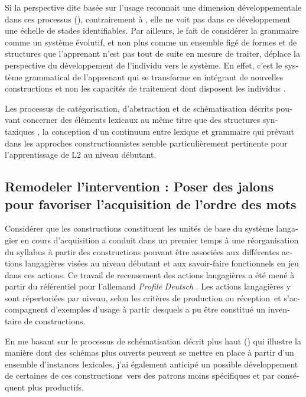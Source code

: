 \documentclass[output=paper]{langscibook}
\begin{document}
\begin{otherlanguage}{french}
Si la perspective dite basée sur l’usage reconnait une dimension développementale dans ces processus (\citealt[187]{Ellis2015}), contrairement à \citet{Pienemann1999}, elle ne voit pas dans ce développement une échelle de stades identifiables. Par ailleurs, le fait de considérer la grammaire comme un système évolutif, et non plus comme un ensemble figé de formes et de structures que l’apprenant n’est pas tout de suite en mesure de traiter, déplace la perspective du développement de l’individu vers le système. En effet, c’est le système grammatical de l’apprenant qui se transforme en intégrant de nouvelles constructions et non les capacités de traitement dont disposent les individus \citep{Diessel2007}. 

\begin{sloppypar}
Les processus de catégorisation, d’abstraction et de schématisation décrits pouvant concerner des éléments lexicaux au même titre que des structures syntaxiques \citep{Behrens2011}, la conception d’un continuum entre lexique et grammaire qui prévaut dans les approches constructionnistes semble particulièrement pertinente pour l’apprentissage de L2 au niveau débutant.
\end{sloppypar}

\subsection{Remodeler l’intervention : Poser des jalons pour favoriser l’acquisition de l’ordre des mots}\label{sec:felce:4.3}\largerpage

Considérer que les constructions constituent les unités de base du système langagier en cours d’acquisition a conduit dans un premier temps à une réorganisation du syllabus à partir des constructions pouvant être associées aux différentes actions langagières visées au niveau débutant et aux savoir-faire fonctionnels en jeu dans ces actions. Ce travail de recensement des actions langagières a été mené à partir du référentiel pour l’allemand \textit{Profile} \textit{Deutsch} \citep{GlaboniatEtAl2005}. Les actions langagières y sont répertoriées par niveau, selon les critères de production ou réception~et s’accompagnent d’exemples d’usage à partir desquels a pu être constitué un inventaire de constructions. 

En me basant sur le processus de schématisation décrit plus haut () qui illustre la manière dont des schémas plus ouverts peuvent se mettre en place à partir d’un ensemble d’instances lexicales, j'ai également anticipé un possible développement de certaines de ces constructions~vers des patrons moins spécifiques et par conséquent plus productifs. 


\end{otherlanguage}
\end{document}
